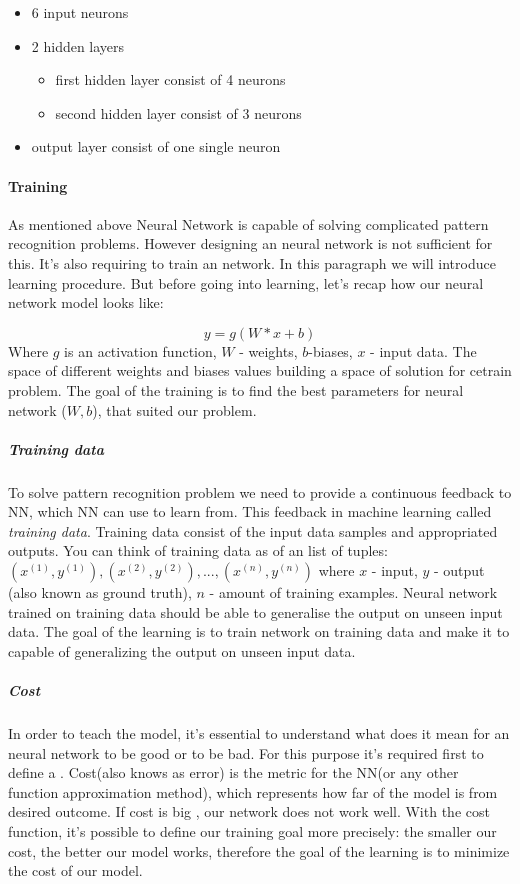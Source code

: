 \begin{itemize}
	\item 6 input neurons
	\item 2 hidden layers
		\begin{itemize}
			\item first hidden layer consist of 4 neurons
			\item second hidden layer consist of 3 neurons
		\end{itemize}
	\item output layer consist of one single neuron
\end{itemize}


\paragraph{Training}
As mentioned above Neural Network is capable of solving complicated
pattern recognition problems. However designing an neural network is not sufficient
for this. It's also requiring to train an network. In this paragraph we will
introduce learning procedure. But before going into learning, let's recap
how our neural network model looks like:

\begin{equation} \label{eq:nn}
	y = g(W * x + b)
\end{equation}
Where $g$ is an activation function, $W$ - weights, $b$-biases, $x$ - input data.
The space of different weights and biases values building a space of solution for
cetrain problem. The goal of the training is to find the best parameters
for neural network ($W, b$), that suited our problem.

\subparagraph{Training data} To solve pattern recognition problem we need to provide
a continuous feedback to NN, which NN can use to learn from. This feedback
in machine learning called \emph{training data}.
Training data consist of the input data samples
and appropriated outputs. You can think of training data as of an list of tuples:
${(x^{(1)}, y^{(1)}), (x^{(2)}, y^{(2)}), ..., (x^{(n)}, y^{(n)})}$ where $x$ - input,
$y$ - output (also known as ground truth), $n$ - amount of training examples. Neural network trained on training data
should be able to generalise the output on unseen input data.
The goal of the learning is to train network on training data and make it to capable of generalizing the output on unseen input data.

\subparagraph{Cost} In order to teach the model, it's essential to understand
what does it mean for an neural network to be good or to be bad. For this purpose
it's required first to define a . Cost(also knows as error) is the metric
for the NN(or any other function approximation method), which represents how far of
the model is from desired outcome. If cost is big , our network does not work well.
With the cost function, it's possible
to define our training goal more precisely: the smaller our cost, the better our
model works, therefore the goal of the learning is to minimize the cost of our model.

